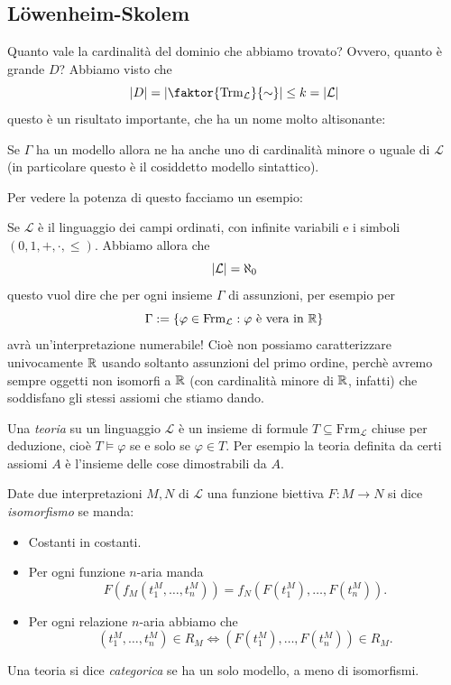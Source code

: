 \documentclass[11pt]{scrartcl}
\begin{document}
 	\subsection{L\"owenheim-Skolem}
 	Quanto vale la cardinalità del dominio che abbiamo trovato? Ovvero, quanto è grande $D$? Abbiamo visto che 
 	$$\abs{D}=\abs{\faktor{\text{Trm}_\mathcal{L}}{\sim}}\le k=\abs{\mathcal{L}}$$
 	questo è un risultato importante, che ha un nome molto altisonante:
 	\begin{corollary}
 		Se $\Gamma$ ha un modello allora ne ha anche uno di cardinalità minore o uguale di $\mathcal{L}$ (in particolare questo è il cosiddetto modello sintattico).
 	\end{corollary}
 	Per vedere la potenza di questo facciamo un esempio:
 	\begin{example}
 		Se $\mathcal{L}$ è il linguaggio dei campi ordinati, con infinite variabili e i simboli $(0,1,+,\cdot,\le)$. Abbiamo allora che 
 		$$\left\lvert \mathcal{L} \right\rvert=\aleph_0$$
 		questo vuol dire che per ogni insieme $\Gamma$ di assunzioni, per esempio per
 		$$\Gamma:=\left\{\varphi\in \text{Frm}_\mathcal{L}:\varphi\text{ è vera in $\mathbb R$}\right\}$$
 		avrà un'interpretazione numerabile! Cioè non possiamo caratterizzare univocamente $\mathbb R$ usando soltanto assunzioni del primo ordine, perchè avremo sempre oggetti non isomorfi a $\mathbb R$ (con cardinalità minore di $\mathbb R$, infatti) che soddisfano gli stessi assiomi che stiamo dando.
 	\end{example}
 	\begin{definition}[Teoria]
 		Una \textit{teoria} su un linguaggio $\mathcal{L}$ è un insieme di formule $T\subseteq \text{Frm}_\mathcal{L}$ chiuse per deduzione, cioè $T\models \varphi$ se e solo se $\varphi\in T$. Per esempio la teoria definita da certi assiomi $A$ è l'insieme delle cose dimostrabili da $A$.
 	\end{definition}
 	\begin{definition}
 		Date due interpretazioni $M,N$ di $\mathcal{L}$ una funzione biettiva $F:M\to N$ si dice \textit{isomorfismo} se manda:
 		\begin{itemize}
 			\item Costanti in costanti.
 			\item Per ogni funzione $n$-aria manda
 			$$F\left(f_M(t_1^M,\dots,t_n^M)\right)=f_N\left(F(t_1^M),\dots,F(t_n^M)\right).$$
 			\item Per ogni relazione $n$-aria abbiamo che 
 			$$\left(t_1^M,\dots,t_n^M\right)\in R_M \iff \left(F(t_1^M),\dots,F(t_n^M)\right)\in R_M.$$
 		\end{itemize}
 	\end{definition}
 	\begin{definition}[Categoricità]
 		Una teoria si dice \textit{categorica} se ha un solo modello, a meno di isomorfismi.
 	\end{definition}
\end{document}
